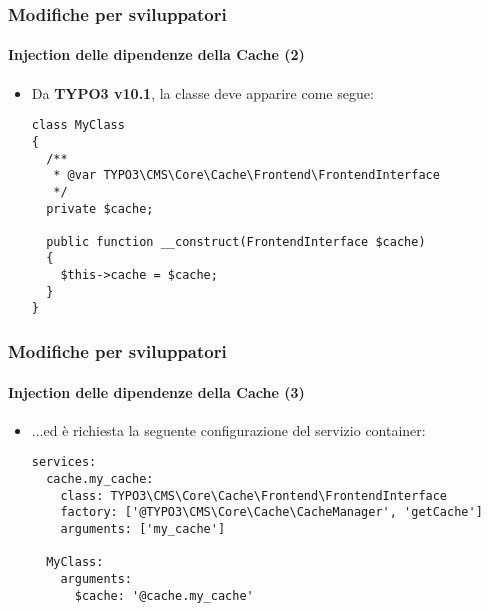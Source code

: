 
\begin{frame}[fragile]
	\frametitle{Modifiche per sviluppatori}
	\framesubtitle{Injection delle dipendenze della Cache (2)}

	\lstset{basicstyle=\tiny\ttfamily}

	\begin{itemize}
		\item Da \textbf{TYPO3 v10.1}, la classe deve apparire come segue:

\begin{lstlisting}
class MyClass
{
  /**
   * @var TYPO3\CMS\Core\Cache\Frontend\FrontendInterface
   */
  private $cache;

  public function __construct(FrontendInterface $cache)
  {
    $this->cache = $cache;
  }
}
\end{lstlisting}

	\end{itemize}

\end{frame}


\begin{frame}[fragile]
	\frametitle{Modifiche per sviluppatori}
	\framesubtitle{Injection delle dipendenze della Cache (3)}

	\lstset{basicstyle=\tiny\ttfamily}

	\begin{itemize}
		\item ...ed è richiesta la seguente configurazione del servizio container:

\begin{lstlisting}
services:
  cache.my_cache:
    class: TYPO3\CMS\Core\Cache\Frontend\FrontendInterface
    factory: ['@TYPO3\CMS\Core\Cache\CacheManager', 'getCache']
    arguments: ['my_cache']

  MyClass:
    arguments:
      $cache: '@cache.my_cache'
\end{lstlisting}

	\end{itemize}

\end{frame}

